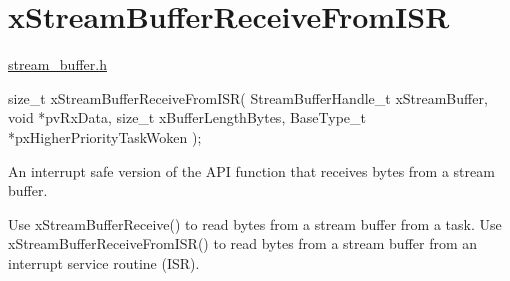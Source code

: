 \hypertarget{group__x_stream_buffer_receive_from_i_s_r}{}\section{x\+Stream\+Buffer\+Receive\+From\+I\+SR}
\label{group__x_stream_buffer_receive_from_i_s_r}
\mbox{\hyperlink{stream__buffer_8h_source}{stream\+\_\+buffer.\+h}}


\begin{DoxyPre}
size\_t xStreamBufferReceiveFromISR( StreamBufferHandle\_t xStreamBuffer,
                                    void *pvRxData,
                                    size\_t xBufferLengthBytes,
                                    BaseType\_t *pxHigherPriorityTaskWoken );
\end{DoxyPre}


An interrupt safe version of the A\+PI function that receives bytes from a stream buffer.

Use x\+Stream\+Buffer\+Receive() to read bytes from a stream buffer from a task. Use x\+Stream\+Buffer\+Receive\+From\+I\+S\+R() to read bytes from a stream buffer from an interrupt service routine (I\+SR).


